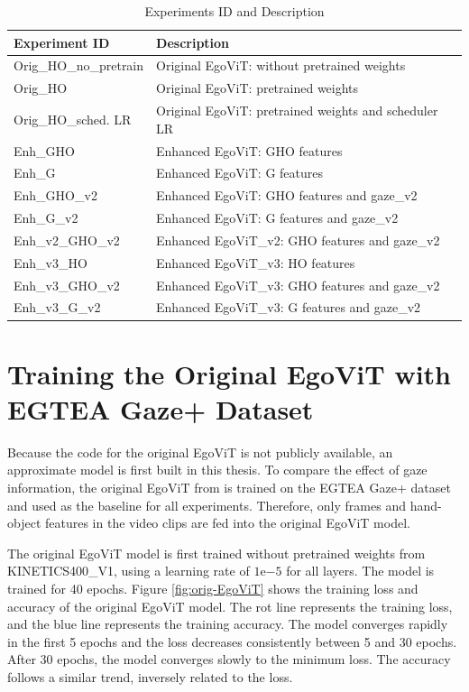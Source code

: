 \begin{table}[htbp]
    \centering
    \caption{Experiments ID and Description}
    \begin{tabular}{ll}
    \hline\hline
    Experiment ID & Description \\
    \hline
    Orig\_HO\_no\_pretrain  & Original EgoViT: without pretrained weights \\
    Orig\_HO                & Original EgoViT: pretrained weights \\
    Orig\_HO\_sched. LR     & Original EgoViT: pretrained weights and scheduler LR \\
    Enh\_GHO             & Enhanced EgoViT: GHO features \\
    Enh\_G               & Enhanced EgoViT: G features \\
    Enh\_GHO\_v2         & Enhanced EgoViT: GHO features and gaze\_v2 \\
    Enh\_G\_v2           & Enhanced EgoViT: G features and gaze\_v2 \\
    Enh\_v2\_GHO\_v2     & Enhanced EgoViT\_v2: GHO features and gaze\_v2 \\
    Enh\_v3\_HO          & Enhanced EgoViT\_v3: HO features \\
    Enh\_v3\_GHO\_v2     & Enhanced EgoViT\_v3: GHO features and gaze\_v2 \\
    Enh\_v3\_G\_v2       & Enhanced EgoViT\_v3: G features and gaze\_v2 \\
    \hline\hline
    \end{tabular}
    \label{tab: exp_id}
\end{table}
\clearpage


\section{Training the Original EgoViT with EGTEA Gaze+ Dataset}
\label{sec:training_original_egovit}
Because the code for the original EgoViT is not publicly available, an approximate model is first built in this thesis. To compare the effect of gaze information, the original EgoViT from \cite{pan_egovit_2023} is trained on the EGTEA Gaze+ dataset and used as the baseline for all experiments. Therefore, only frames and hand-object features in the video clips are fed into the original EgoViT model.

The original EgoViT model is first trained without pretrained weights from KINETICS400\_V1, using a learning rate of $1 \mathrm{e}{-5}$ for all layers. The model is trained for 40 epochs. Figure \ref{fig:orig-EgoViT} shows the training loss and accuracy of the original EgoViT model. The rot line represents the training loss, and the blue line represents the training accuracy. The model converges rapidly in the first 5 epochs and the loss decreases consistently between 5 and 30 epochs. After 30 epochs, the model converges slowly to the minimum loss. The accuracy follows a similar trend, inversely related to the loss.


